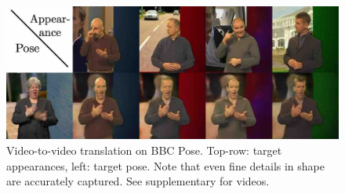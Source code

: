 	\begin{figure}[t]
		\centering
		\includegraphics[trim={0cm 0cm 0cm 0cm},clip, width=.7\linewidth]{fig/factor/bbcthumb5}
		\caption{Video-to-video translation on BBC Pose. Top-row: target appearances, left: target pose.
		Note that even fine details in shape are accurately captured. See supplementary for videos.}
		\label{fig:bbcthumb}
	\end{figure}

